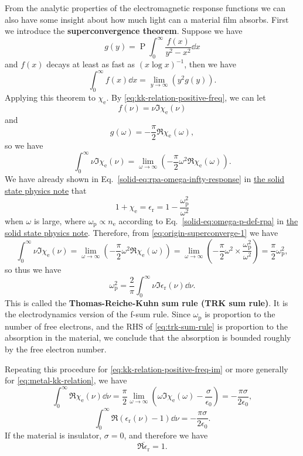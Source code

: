 \documentclass[hyperref, a4paper]{article}
\DeclareMathOperator{\primevalue}{P}
\newcommand*{\concept}[1]{{\textbf{#1}}}
\newcommand{\soliddoc}{\href{../solid/solid}{the solid state physics note}}
\begin{document}
From the analytic properties of the electromagnetic response functions we can also have some insight about how much light can a material film absorbs.
First we introduce the \concept{superconvergence theorem}. Suppose we have 
\begin{equation}
    g(y) = \primevalue \int_0^\infty \frac{f(x)}{y^2 - x^2} \dd{x}
\end{equation}
and $f(x)$ decays at least as fast as $(x \log x)^{-1}$, then we have
\begin{equation}
    \int_0^\infty f(x) \dd{x} = \lim_{y \to \infty} (y^2 g(y)).
\end{equation}
Applying this theorem to $\chi_\text{e}$. By \eqref{eq:kk-relation-positive-freq}, we can let 
\[
    f(\nu) = \nu \Im \chi_\text{e}(\nu)
\]
and 
\[
    g(\omega) = - \frac{\pi}{2} \Re \chi_\text{e}(\omega),
\]
so we have 
\begin{equation}
    \int_0^\infty \nu \Im \chi_\text{e}(\nu) = \lim_{\omega \to \infty} \left( - \frac{\pi}{2} \omega^2 \Re \chi_\text{e}(\omega) \right).
    \label{eq:origin-superconverge-1}
\end{equation}
We have already shown in Eq.~\eqref{solid-eq:rpa-omega-infty-response} in \soliddoc{} that 
\[
    1 + \chi_\text{e} = \epsilon_\text{r} = 1 - \frac{\omega_\text{p}^2}{\omega^2} 
\]
when $\omega$ is large, where $\omega_\text{p} \propto n_\text{e}$ according to Eq.~\eqref{solid-eq:omega-p-def-rpa} in \soliddoc. 
Therefore, from \eqref{eq:origin-superconverge-1} we have 
\[
    \int_0^\infty \nu \Im \chi_\text{e}(\nu) = \lim_{\omega \to \infty} \left( - \frac{\pi}{2} \omega^2 \Re \chi_\text{e}(\omega) \right) = \lim_{\omega \to \infty} \left( -\frac{\pi}{2} \omega^2 \times \frac{\omega_\text{p}^2}{\omega^2} \right) = \frac{\pi}{2} \omega_\text{p}^2,
\]
so thus we have 
\begin{equation}
    \omega_\text{p}^2 = \frac{2}{\pi} \int_0^\infty \nu \Im \epsilon_\text{r}(\nu) \dd{\nu}.
    \label{eq:trk-sum-rule}
\end{equation}
This is called the \concept{Thomas-Reiche-Kuhn sum rule (TRK sum rule)}.
It is the electrodynamics version of the f-sum rule.
Since $\omega_\text{p}$ is proportion to the number of free electrons, and the RHS of \eqref{eq:trk-sum-rule} is proportion to the absorption in the material, we conclude that the absorption is bounded roughly by the free electron number.

Repeating this procedure for \eqref{eq:kk-relation-positive-freq-im} or more generally for \eqref{eq:metal-kk-relation}, we have %
\[
    \int_0^\infty \Re \chi_\text{e}(\nu) \dd{\nu} = \frac{\pi}{2} \lim_{\omega \to \infty} \left( \omega \Im \chi_\text{e}(\omega) - \frac{\sigma }{\epsilon_0 } \right) = - \frac{\pi \sigma}{2 \epsilon_0},
\]
\begin{equation}
    \int_0^\infty \Re (\epsilon_\text{r}(\nu) - 1) \dd{\nu} = - \frac{\pi \sigma}{2\epsilon_0}.
\end{equation}
If the material is insulator, $\sigma = 0$, and therefore we have 
\begin{equation}
    \overline{\Re \epsilon_\text{r}} = 1.
    \label{eq:average-epsilon-r-1}
\end{equation}
\end{document}
